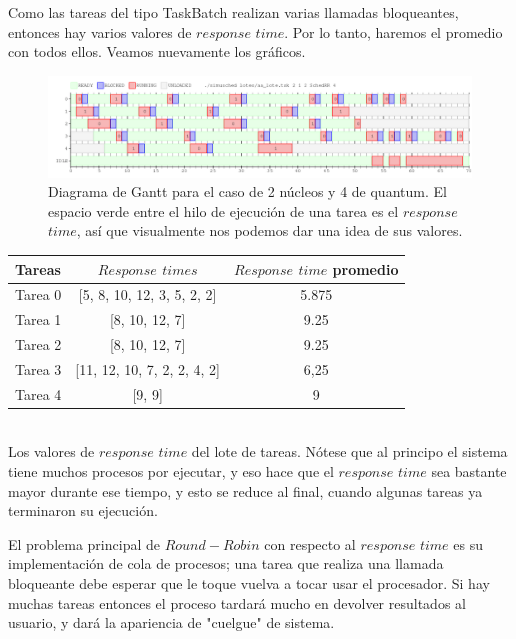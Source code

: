 Como las tareas del tipo TaskBatch realizan varias llamadas bloqueantes, entonces hay varios valores de $response$ $time$. Por lo tanto, haremos el promedio con todos ellos. Veamos nuevamente los gráficos.

\begin{figure}[H]
	\includegraphics[scale=0.49]{ej7/ej7_2_4.png}
	\caption{Diagrama de Gantt para el caso de 2 núcleos y 4 de quantum. El espacio verde entre el hilo de ejecución de una tarea es el $response$ $time$, así que visualmente nos podemos dar una idea de sus valores.}
\end{figure}

\begin{center}
  \begin{tabular}{ |l | c | c | }
    \hline
    Tareas    & $Response$ $times$ & $Response$ $time$ promedio  \\ \hline
    Tarea 0 & [5, 8, 10, 12, 3, 5, 2, 2] & 5.875 \\ \hline
    Tarea 1 & [8, 10, 12, 7]    & 9.25       \\ \hline
    Tarea 2 & [8, 10, 12, 7]   & 9.25        \\ \hline
    Tarea 3 & [11, 12, 10, 7, 2, 2, 4, 2]  & 6,25          \\ \hline
    Tarea 4 & [9, 9]   & 9          \\ \hline
  \end{tabular} \\ \vspace{10pt} 
	Los valores de $response$ $time$ del lote de tareas. Nótese que al principo el sistema tiene muchos procesos por ejecutar, y eso hace que el $response$ $time$ sea bastante mayor durante ese tiempo, y esto se reduce al final, cuando algunas tareas ya terminaron su ejecución.
\end{center}

El problema principal de $Round-Robin$ con respecto al $response$ $time$ es su implementación de cola de procesos; una tarea que realiza una llamada bloqueante debe esperar que le toque vuelva a tocar usar el procesador. Si hay muchas tareas entonces el proceso tardará mucho en devolver resultados al usuario, y dará la apariencia de "cuelgue" de sistema.  

